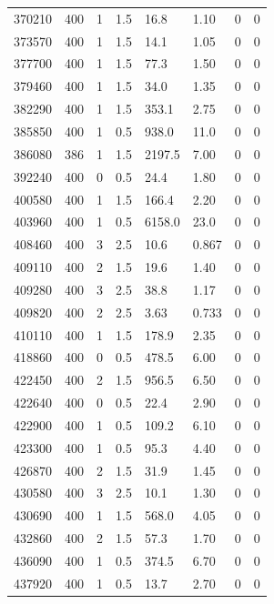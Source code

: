 \documentclass[preview]{standalone}
\begin{document}
{{{{\begin{tabular}{L{1.2cm}C{1.2cm} C{0.3cm}C{0.5cm} C{1.4cm}C{1.4cm} C{1.4cm}C{1.4cm}}
  370210  &   400  & 1     & 1.5 &  16.8  & 1.10  & 0 &  0   \\ 
  373570  &   400  & 1     & 1.5 &  14.1  & 1.05  & 0 &  0   \\ 
  377700  &   400  & 1     & 1.5 &  77.3  & 1.50  & 0 &  0   \\ 
  379460  &   400  & 1     & 1.5 &  34.0  & 1.35  & 0 &  0   \\ 
  382290  &   400  & 1     & 1.5 &  353.1  & 2.75  & 0 &  0   \\ 
  385850  &   400  & 1     & 0.5 &  938.0  & 11.0  & 0 &  0   \\ 
  386080  &   386  & 1     & 1.5 &  2197.5  & 7.00  & 0 &  0   \\ 
  392240  &   400  & 0     & 0.5 &  24.4  & 1.80  & 0 &  0   \\ 
  400580  &   400  & 1     & 1.5 &  166.4  & 2.20  & 0 &  0   \\ 
  403960  &   400  & 1     & 0.5 &  6158.0  & 23.0  & 0 &  0   \\ 
  408460  &   400  & 3     & 2.5 &  10.6  & 0.867  & 0 &  0   \\ 
  409110  &   400  & 2     & 1.5 &  19.6  & 1.40  & 0 &  0   \\ 
  409280  &   400  & 3     & 2.5 &  38.8  & 1.17  & 0 &  0   \\ 
  409820  &   400  & 2     & 2.5 &  3.63  & 0.733  & 0 &  0   \\ 
  410110  &   400  & 1     & 1.5 &  178.9  & 2.35  & 0 &  0   \\ 
  418860  &   400  & 0     & 0.5 &  478.5  & 6.00  & 0 &  0   \\ 
  422450  &   400  & 2     & 1.5 &  956.5  & 6.50  & 0 &  0   \\ 
  422640  &   400  & 0     & 0.5 &  22.4  & 2.90  & 0 &  0   \\ 
  422900  &   400  & 1     & 0.5 &  109.2  & 6.10  & 0 &  0   \\ 
  423300  &   400  & 1     & 0.5 &  95.3  & 4.40  & 0 &  0   \\ 
  426870  &   400  & 2     & 1.5 &  31.9  & 1.45  & 0 &  0   \\ 
  430580  &   400  & 3     & 2.5 &  10.1  & 1.30  & 0 &  0   \\ 
  430690  &   400  & 1     & 1.5 &  568.0  & 4.05  & 0 &  0   \\ 
  432860  &   400  & 2     & 1.5 &  57.3  & 1.70  & 0 &  0   \\ 
  436090  &   400  & 1     & 0.5 &  374.5  & 6.70  & 0 &  0   \\ 
  437920  &   400  & 1     & 0.5 &  13.7  & 2.70  & 0 &  0   \\ 
\hline 
\end{tabular} 

}}}}
\end{document}
